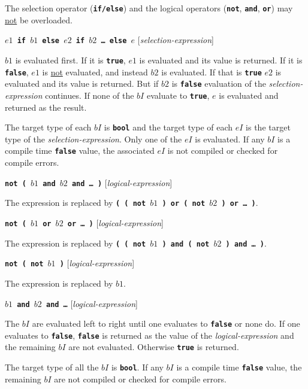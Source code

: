 \documentclass[12pt]{article}
\newcommand{\TT}[1]{{\tt \bfseries #1}}
\newenvironment{indpar}[1][0.3in]%
	{\begin{list}{}%
		     {\setlength{\itemsep}{0in}%
		      \setlength{\topsep}{0in}%
		      \setlength{\parsep}{1ex}%
		      \setlength{\labelwidth}{#1}%
		      \setlength{\leftmargin}{#1}%
		      \addtolength{\leftmargin}{\labelsep}}%
	 \item}%
	{\end{list}}
\begin{document}
The selection operator (\TT{if/else}) and the logical
operators (\TT{not}, \TT{and}, \TT{or}) may \underline{not}
be overloaded.

\medskip

\TT{$e1$ if $b1$ else $e2$ if $b2$ \ldots{} else $e$}
\hfill [{\em selection-expression}]
\begin{indpar}
$b1$ is evaluated first.  If it is \TT{true}, $e1$ is evaluated and its
value is returned.  If it is \TT{false}, $e1$ is \underline{not}
evaluated, and instead $b2$ is evaluated.  If that is \TT{true}
$e2$ is evaluated and its value is returned.  But if $b2$ is \TT{false}
evaluation of the {\em selection-expression} continues.  If none of
the $bI$ evaluate to \TT{true}, $e$ is evaluated and returned as the result.

The target type of each $bI$ is \TT{bool} and the target type of each
$eI$ is the target type of the {\em selection-expression}.
Only one of the $eI$ is evaluated.  If any $bI$ is a compile time
\TT{false} value, the associated $eI$ is not compiled or checked
for compile errors.
\end{indpar}

\TT{not ( $b1$ and $b2$ and \ldots{} )}
\hfill [{\em logical-expression}]
\begin{indpar}
The expression is replaced by
\TT{( ( not $b1$ ) or ( not $b2$ ) or \ldots{} )}.
\end{indpar}

\TT{not ( $b1$ or $b2$ or \ldots{} )}
\hfill [{\em logical-expression}]
\begin{indpar}
The expression is replaced by
\TT{( ( not $b1$ ) and ( not $b2$ ) and \ldots{} )}.
\end{indpar}

\TT{not ( not $b1$ )}
\hfill [{\em logical-expression}]
\begin{indpar}
The expression is replaced by $b1$.
\end{indpar}

\TT{$b1$ and $b2$ and \ldots{}}
\hfill [{\em logical-expression}]
\begin{indpar}
The $bI$ are evaluated left to right until one evaluates to
\TT{false} or none do.  If one evaluates to \TT{false},
\TT{false} is returned as the value of the {\em logical-expression}
and the remaining $bI$ are not evaluated.
Otherwise \TT{true} is returned.

The target type of all the $bI$ is \TT{bool}.  If any $bI$ is a
compile time \TT{false} value, the remaining $bI$ are not compiled
or checked for compile errors.
\end{indpar}
\end{document}
